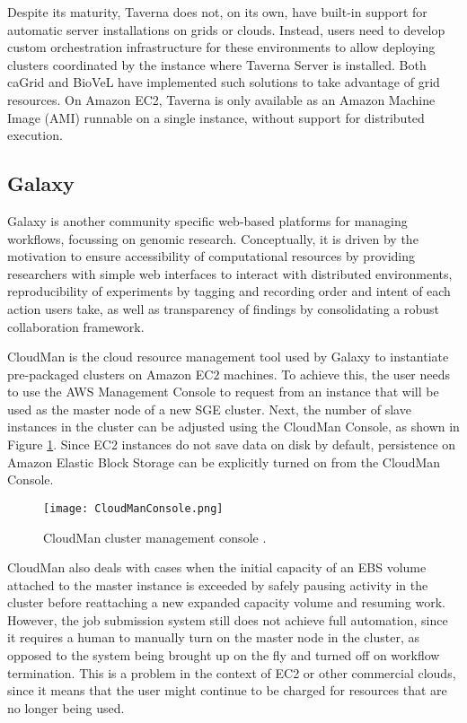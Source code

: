 Despite its maturity, Taverna does not, on its own, have built-in support for automatic server installations on grids or clouds. Instead, users need to develop custom orchestration infrastructure for these environments to allow deploying clusters coordinated by the instance where Taverna Server is installed. Both caGrid \cite{caGrid} and BioVeL \cite{BioVeL} have implemented such solutions \cite{TavernaGrid, Donvito} to take advantage of grid resources. On Amazon EC2, Taverna is only available as an Amazon Machine Image (AMI) runnable on a single instance, without support for distributed execution.

\subsection{Galaxy}

Galaxy \cite{Goecks2010} is another community specific web-based platforms for managing workflows, focussing on genomic research. Conceptually, it is driven by the motivation to ensure accessibility of computational resources by providing researchers with simple web interfaces to interact with distributed environments, reproducibility of experiments by tagging and recording order and intent of each action users take, as well as transparency of findings by consolidating a robust collaboration framework.

CloudMan \cite{Afgan2010} is the cloud resource management tool used by Galaxy to instantiate pre-packaged clusters on Amazon EC2 machines. To achieve this, the user needs to use the AWS Management Console to request from an instance that will be used as the master node of a new SGE cluster. Next, the number of slave instances in the cluster can be adjusted using the CloudMan Console, as shown in Figure \ref{CloudManConsole}. Since EC2 instances do not save data on disk by default, persistence on Amazon Elastic Block Storage can be explicitly turned on from the CloudMan Console.

\begin{figure}[H]
	\centering
		\texttt{[image: CloudManConsole.png]}
	\caption{CloudMan cluster management console \cite{Afgan2010}.}
	\label{CloudManConsole}
\end{figure}

CloudMan also deals with cases when the initial capacity of an EBS volume attached to the master instance is exceeded by safely pausing activity in the cluster before reattaching a new expanded capacity volume and resuming work. However, the job submission system still does not achieve full automation, since it requires a human to manually turn on the master node in the cluster, as opposed to the system being brought up on the fly and turned off on workflow termination. This is a problem in the context of EC2 or other commercial clouds, since it means that the user might continue to be charged for resources that are no longer being used.

